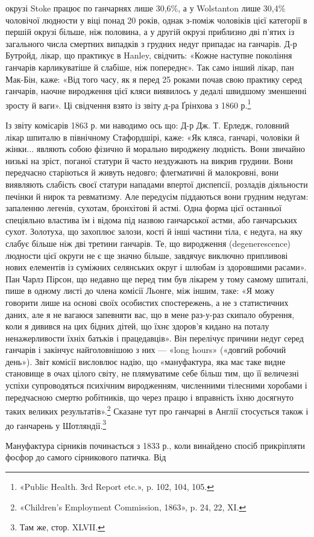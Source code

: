 окрузі Stoke працює по ганчарнях лише 30,6\%, а у Wolstanton
лише 30,4\% чоловічої людности у віці понад 20 років, однак
з-поміж чоловіків цієї категорії в першій окрузі більше, ніж
половина, а у другій окрузі приблизно дві п’ятих із загального
числа смертних випадків з грудних недуг припадає на ганчарів.
Д-р Бутройд, лікар, що практикує в Hanley, свідчить: «Кожне
наступне покоління ганчарів карликуватіше й слабіше, ніж попереднє».
Так само інший лікар, пан Мак-Бін, каже: «Від того
часу, як я перед 25 роками почав свою практику серед ганчарів,
наочне виродження цієї кляси виявилось у дедалі швидшому
зменшенні зросту й ваги». Ці свідчення взято із звіту д-ра
Ґрінхова з 1860 р.\footnote{
«Public Health. Зrd Report etc.», p. 102, 104, 105.
}

Із звіту комісарів 1863 р. ми наводимо ось що: Д-р Дж.
Т. Ерледж, головний лікар шпиталю в північному Стафордшірі,
каже: «Як кляса, ганчарі, чоловіки й жінки... являють собою
фізично й морально вироджену людність. Вони звичайно низькі
на зріст, поганої статури й часто нездужають на викрив грудини.
Вони передчасно старіються й живуть недовго; флегматичні й
малокровні, вони виявляють слабість своєї статури нападами
впертої диспепсії, розладів діяльности печінки й нирок та ревматизму.
Але передусім піддаються вони грудним недугам: запаленню
легенів, сухотам, бронхітові й астмі. Одна форма цієї
останньої спеціяльно властива їм і відома під назвою ганчарської
астми, або ганчарських сухот. Золотуха, що захоплює залози,
кості й інші частини тіла, є недуга, на яку слабує більше ніж
дві третини ганчарів. Те, що виродження (degenerescence) людности
цієї округи не є ще значно більше, завдячує виключно
припливові нових елементів із суміжних селянських округ і
шлюбам із здоровшими расами». Пан Чарлз Пірсон, що недавно
ще перед тим був лікарем у тому самому шпиталі, пише
в одному листі до члена комісії Льонге, між іншим, таке: «Я можу
говорити лише на основі своїх особистих спостережень, а не з
статистичних даних, але я не вагаюся запевняти вас, що в мене
раз-у-раз скипало обурення, коли я дивився на цих бідних
дітей, що їхнє здоров’я кидано на поталу ненажерливости їхніх
батьків і працедавців». Він перелічує причини недуг серед ганчарів
і закінчує найголовнішою з них — «long hours» («довгий
робочий день»). Звіт комісії висловлює надію, що «мануфактура,
яка має таке видне становище в очах цілого світу, не плямуватиме
себе більш тим, що її величезні успіхи супроводяться психічним
виродженням, численними тілесними хоробами і передчасною
смертю робітників, що через працю і вправність їхню
досягнуто таких великих результатів».\footnote{
«Children’s Employment Commission, 1863», p. 24, 22, XI.
} Сказане тут про ганчарні
в Англії стосується також і до ганчарень у Шотляндії.\footnote{
Там же, стор. XLVII.
}

Мануфактура сірників починається з 1833 р., коли винайдено
спосіб прикріпляти фосфор до самого сірникового патичка. Від